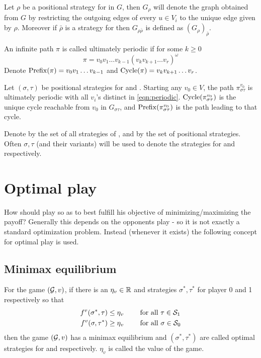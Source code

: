 Let $\rho$ be a positional strategy for  in $G$, then $G_{\rho}$ will denote the graph obtained from $G$ by restricting the outgoing edges of every $u\in V_i$ to the unique edge given by $\rho$. Moreover if $\bar{\rho}$ is a strategy for  then $G_{\rho\bar{\rho}}$ is defined as $(G_\rho)_{\bar{\rho}}$.

An infinite path $\pi$ is called ultimately periodic if for some $k \geq 0$
\begin{equation}
    \pi = v_0 v_1 \ldots v_{k-1} (v_k v_{k+1} \ldots v_r)^\omega \label{eqn:periodic}
\end{equation}
Denote $\operatorname{Prefix}(\pi)=v_0 v_1 \ldots v_{k-1}$ and $\operatorname{Cycle}(\pi)=v_k v_{k+1} \ldots v_r$.

Let $(\sigma,\tau)$ be positional strategies for  and . Starting any $v_0 \in V$, the path $\pi^{v_0}_{\sigma\tau}$ is ultimately periodic with all $v_i$'s distinct in \eqref{eqn:periodic}.  $\operatorname{Cycle}(\pi^{v_0}_{\sigma\tau})$ is the unique cycle reachable from $v_0$ in $G_{\sigma\tau}$, and $\operatorname{Prefix}(\pi^{v_0}_{\sigma\tau})$ is the path leading to that cycle.

Denote by  the set of all strategies of , and by  the set of positional strategies. Often $\sigma,\tau$ (and their variants) will be used to denote the strategies for  and  respectively. 

\section{Optimal play}
How should  play so as to best fulfill his objective of minimizing/maximizing the payoff? Generally this depends on the opponents play - so it is not exactly a standard optimization problem. Instead (whenever it exists) the following concept for optimal play is used.
\subsection{Minimax equilibrium}
For the game $(\mathcal{G},v)$, if there is an $\eta_v \in \mathbb{R}$ and strategies $\sigma^*,\tau^*$ for player 0 and 1 respectively so that
\begin{equation}
\begin{aligned}
    f^v(\sigma^*,\tau) \leq \eta_v \qquad & \text{ for all } \tau \in \mathcal{S}_1 \\
    f^v(\sigma, \tau^*)  \geq \eta_v \qquad & \text{ for all } \sigma \in \mathcal{S}_0 
\end{aligned} \label{eq:MinMax2}
\end{equation}
\newcommand{\eqminmax}{\eqref{eq:MinMax2}\ }
then the game $(\mathcal{G},v)$ has a minimax equilibrium and $(\sigma^*,\tau^*)$ are called optimal strategies for  and  respectively. $\eta_v$ is called the value of the game.


